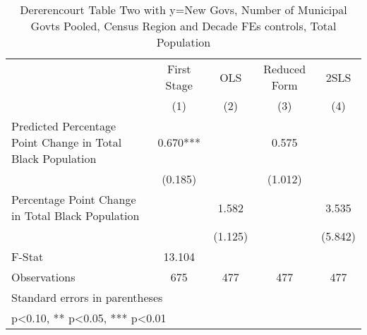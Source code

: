 \begin{table}[htbp]\centering
\def\sym#1{\ifmmode^{#1}\else\(^{#1}\)\fi}
\caption{Dererencourt Table Two with y=New Govs, Number of Municipal Govts  Pooled, Census Region and Decade FEs controls, Total Population}
\begin{tabular}{l*{4}{c}}
\toprule
                    & First Stage   &         OLS   &Reduced Form   &        2SLS   \\
                    &\multicolumn{1}{c}{(1)}   &\multicolumn{1}{c}{(2)}   &\multicolumn{1}{c}{(3)}   &\multicolumn{1}{c}{(4)}   \\
\midrule
Predicted Percentage Point Change in Total Black Population&       0.670***&               &       0.575   &               \\
                    &     (0.185)   &               &     (1.012)   &               \\
\addlinespace
Percentage Point Change in Total Black Population&               &       1.582   &               &       3.535   \\
                    &               &     (1.125)   &               &     (5.842)   \\
\midrule
F-Stat              &      13.104   &               &               &               \\
Observations        &         675   &         477   &         477   &         477   \\
\bottomrule
\multicolumn{5}{l}{\footnotesize Standard errors in parentheses}\\
\multicolumn{5}{l}{\footnotesize * p<0.10, ** p<0.05, *** p<0.01}\\
\end{tabular}
\end{table}
